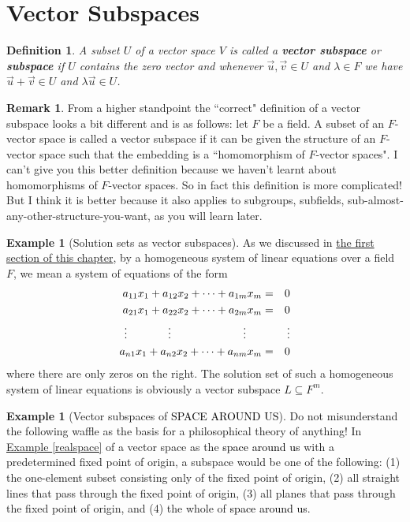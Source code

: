 \documentclass[11pt]{amsbook}
\newtheorem{definition}[theorem]{Definition}
\theoremstyle{definition}
\newtheorem{rem}[theorem]{Remark}
\newtheorem{ex}[theorem]{Example}
\begin{document}
\section{Vector Subspaces}
\begin{definition}
A subset $U$ of a vector space $V$ is called a {\bf vector subspace} or {\bf subspace} if $U$ contains the zero vector and whenever $\vec{u}, \vec{v} \in U$ and $\lambda \in F$ we have $\vec{u} + \vec{v} \in U$ and $\lambda \vec{u} \in U$.
\end{definition}

\begin{rem} \label{highersubdef} From a higher standpoint the ``correct" definition of a vector subspace looks a bit different and is as follows: let $F$ be a field. A subset of an $F$-vector space is called a vector subspace if it can be given the structure of an $F$-vector space such that the embedding is a ``homomorphism of $F$-vector spaces". I can't give you this better definition because we haven't learnt about homomorphisms of $F$-vector spaces. So in fact this definition is more complicated! But I think it is better because it also applies to subgroups, subfields, sub-almost-any-other-structure-you-want, as you will learn later.
\end{rem}

\begin{ex}[Solution sets as vector subspaces] \label{solsaresubs}
As we discussed in \hyperref[slas]{the first section of this chapter}, by a homogeneous system of linear equations over a field $F$, we mean a system of equations of the form
\begin{eqnarray*}
      a_{11} x_1 + a_{12}x_2 +  \cdots  + a_{1m}x_m & =  & 0 \\
      a_{21} x_1 + a_{22}x_2 +  \cdots  + a_{2m}x_m & = & 0 \\
      \vdots  \hspace{13mm} \vdots \hspace{23mm} \vdots \hspace{5mm} &&  \, \vdots \\
      a_{n1} x_1 + a_{n2}x_2 + \cdots  + a_{nm}x_m & =  & 0
\end{eqnarray*}
where there are only zeros on the right. The solution set of such a homogeneous system of linear equations is obviously a vector subspace $L \subseteq F^m$.
\end{ex}

\begin{ex}[Vector subspaces of {\textcolor{black}{SPACE AROUND US}}] Do not misunderstand the following waffle as the basis for a philosophical theory of anything! In \hyperref[realspace]{Example \ref{realspace}} of a vector space as the {\textcolor{black}{space around us}} with a predetermined fixed point of origin, a subspace would be one of the following: (1) the one-element subset consisting only of the fixed point of origin, (2) all straight lines that pass through the fixed point of origin, (3) all planes that pass through the fixed point of origin, and (4) the whole of {\textcolor{black}{space around us}}.
\end{ex}
\end{document}
